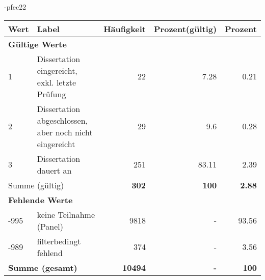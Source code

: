                 \vspace*{-\baselineskip}
					\begin{filecontents}{\jobname-pfec22}
					\begin{longtable}{lXrrr}
					\toprule
					\textbf{Wert} & \textbf{Label} & \textbf{Häufigkeit} & \textbf{Prozent(gültig)} & \textbf{Prozent} \\
					\endhead
					\midrule
					\multicolumn{5}{l}{\textbf{Gültige Werte}}\\

					1 &
					\multicolumn{1}{X}{ Dissertation eingereicht, exkl. letzte Prüfung   } &


					  \num{22} &
					  \num[round-mode=places,round-precision=2]{7,28} &
					    \num[round-mode=places,round-precision=2]{0,21} \\

					2 &
					\multicolumn{1}{X}{ Dissertation abgeschlossen, aber noch nicht eingereicht   } &


					  \num{29} &
					  \num[round-mode=places,round-precision=2]{9,6} &
					    \num[round-mode=places,round-precision=2]{0,28} \\

					3 &
					\multicolumn{1}{X}{ Dissertation dauert an   } &


					  \num{251} &
					  \num[round-mode=places,round-precision=2]{83,11} &
					    \num[round-mode=places,round-precision=2]{2,39} \\
					\midrule
					\multicolumn{2}{l}{Summe (gültig)} &
					  \textbf{\num{302}} &
					\textbf{100} &
					  \textbf{\num[round-mode=places,round-precision=2]{2,88}} \\
					\multicolumn{5}{l}{\textbf{Fehlende Werte}}\\
							-995 &
							keine Teilnahme (Panel) &
							  \num{9818} &
							 - &
							  \num[round-mode=places,round-precision=2]{93,56} \\
							-989 &
							filterbedingt fehlend &
							  \num{374} &
							 - &
							  \num[round-mode=places,round-precision=2]{3,56} \\
					\midrule
					\multicolumn{2}{l}{\textbf{Summe (gesamt)}} &
				      \textbf{\num{10494}} &
				    \textbf{-} &
				    \textbf{100} \\
					\bottomrule
					\end{longtable}
					\end{filecontents}
